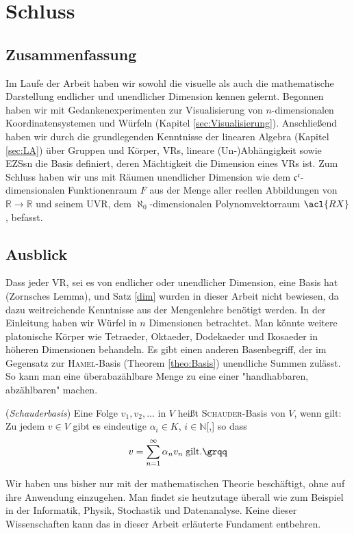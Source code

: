 \chapter{Schluss}
\label{sec:Schluss}
\section{Zusammenfassung}
Im Laufe der Arbeit haben wir sowohl die visuelle als auch die mathematische Darstellung endlicher und unendlicher Dimension kennen gelernt. Begonnen haben wir mit Gedankenexperimenten zur Visualisierung von $n$-dimensionalen Koordinatensystemen und Würfeln (Kapitel \ref{sec:Visualisierung}). Anschließend haben wir durch die grundlegenden Kenntnisse der linearen Algebra (Kapitel \ref{sec:LA}) über Gruppen und Körper, \aclp{VR}, lineare (Un-)Abhängigkeit sowie \aclp{EZS}n die Basis definiert, deren Mächtigkeit die Dimension eines \acl{VR}s ist. Zum Schluss haben wir uns mit Räumen unendlicher Dimension wie dem $\mathfrak{c}^{\mathfrak{c}}$-dimensionalen Funktionenraum $F$ aus der Menge aller reellen Abbildungen von $\mathbb{R}\rightarrow\mathbb{R}$ und seinem \acl{UVR}, dem $\aleph_{0}$-dimensionalen Polynomvektorraum $\acl{RX}$, befasst. 
\section{Ausblick}
Dass jeder \acl{VR}, sei es von endlicher oder unendlicher Dimension, eine Basis hat (Zornsches Lemma), und Satz \ref{dim} wurden in dieser Arbeit nicht bewiesen, da dazu weitreichende Kenntnisse aus der Mengenlehre benötigt werden. In der Einleitung haben wir Würfel in $n$ Dimensionen betrachtet. Man könnte weitere platonische Körper wie Tetraeder, Oktaeder, Dodekaeder und Ikosaeder in höheren Dimensionen behandeln. Es gibt einen anderen Basenbegriff, der im Gegensatz zur \textsc{Hamel}-Basis (Theorem \ref{theo:Basis}) unendliche Summen zulässt. So kann man eine überabazählbare Menge zu eine einer "handhabbaren, abzählbaren" \cite[S.762]{Springer}  machen.
\begin{definition}\cite[S.762, 7.67]{Springer} (\emph{Schauderbasis}) \glqq Eine Folge $v_1,v_2,...$ in $V$ heißt \textsc{Schauder}-Basis von $V$, wenn gilt:
Zu jedem $v \in V$ gibt es eindeutige $\alpha_i \in K$, $i \in \mathbb{N}$[,] so dass \[v = \sum \limits_{n=1}^{\infty} \alpha_n v_n \;\text{gilt.\grqq}\]
\end{definition}
Wir haben uns bisher nur mit der mathematischen Theorie beschäftigt, ohne auf ihre Anwendung einzugehen. Man findet sie heutzutage überall wie zum Beispiel in der Informatik, Physik, Stochastik und Datenanalyse. Keine dieser Wissenschaften kann das in dieser Arbeit erläuterte Fundament entbehren. 